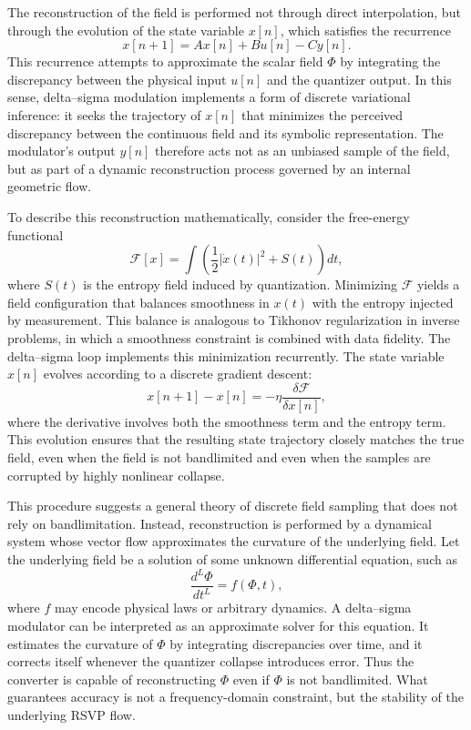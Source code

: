 The reconstruction of the field is performed not through direct interpolation, but through the evolution of the state variable \(x[n]\), which satisfies the recurrence
\[
x[n+1] = A x[n] + B u[n] - C y[n].
\]
This recurrence attempts to approximate the scalar field \(\Phi\) by integrating the discrepancy between the physical input \(u[n]\) and the quantizer output. In this sense, delta–sigma modulation implements a form of discrete variational inference: it seeks the trajectory of \(x[n]\) that minimizes the perceived discrepancy between the continuous field and its symbolic representation. The modulator’s output \(y[n]\) therefore acts not as an unbiased sample of the field, but as part of a dynamic reconstruction process governed by an internal geometric flow.

To describe this reconstruction mathematically, consider the free-energy functional
\[
\mathcal{F}[x] = \int \left( \frac{1}{2} |\dot{x}(t)|^{2} + S(t) \right) dt,
\]
where \(S(t)\) is the entropy field induced by quantization. Minimizing \(\mathcal{F}\) yields a field configuration that balances smoothness in \(x(t)\) with the entropy injected by measurement. This balance is analogous to Tikhonov regularization in inverse problems, in which a smoothness constraint is combined with data fidelity. The delta–sigma loop implements this minimization recurrently. The state variable \(x[n]\) evolves according to a discrete gradient descent:
\[
x[n+1] - x[n] = -\eta \frac{\delta \mathcal{F}}{\delta x[n]},
\]
where the derivative involves both the smoothness term and the entropy term. This evolution ensures that the resulting state trajectory closely matches the true field, even when the field is not bandlimited and even when the samples are corrupted by highly nonlinear collapse.

This procedure suggests a general theory of discrete field sampling that does not rely on bandlimitation. Instead, reconstruction is performed by a dynamical system whose vector flow approximates the curvature of the underlying field. Let the underlying field be a solution of some unknown differential equation, such as
\[
\frac{d^{L} \Phi}{dt^{L}} = f(\Phi, t),
\]
where \(f\) may encode physical laws or arbitrary dynamics. A delta–sigma modulator can be interpreted as an approximate solver for this equation. It estimates the curvature of \(\Phi\) by integrating discrepancies over time, and it corrects itself whenever the quantizer collapse introduces error. Thus the converter is capable of reconstructing \(\Phi\) even if \(\Phi\) is not bandlimited. What guarantees accuracy is not a frequency-domain constraint, but the stability of the underlying RSVP flow.

